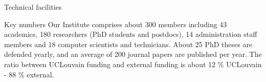 \documentclass[final]{beamer}
\newlength{\onecolwid}
\begin{document}
\begin{frame}[t,fragile]
\begin{columns}[t]
\begin{column}{\onecolwid}
\begin{block}{Technical facilities}
		\begin{alertblock}{Key numbers}
			Our Institute comprises about 300 members including 43 academics, 180 researchers
			(PhD students and postdocs), 14 administration staff members and 18 computer
			scientists and technicians.
			About 25 PhD theses are defended yearly, and an average of 200 journal papers are
			published per year.
			The ratio between UCLouvain funding and external funding is about 12 \% UCLouvain -
			88 \% external.
		\end{alertblock}
  \end{block}
\end{column}

\end{columns} %

\end{frame}
\end{document}
